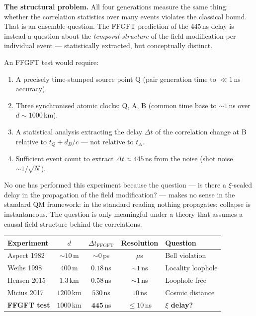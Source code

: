 \textbf{The structural problem.}
All four generations measure the same thing: whether the correlation statistics
over many events violates the classical bound. That is an ensemble question.
The FFGFT prediction of the 445\,ns delay is instead a question about the
\emph{temporal structure} of the field modification per individual event ---
statistically extracted, but conceptually distinct.

An FFGFT test would require:
\begin{enumerate}[leftmargin=1.6em,itemsep=0.2em]
  \item A precisely time-stamped source point Q (pair generation time to
    $\ll 1$\,ns accuracy).
  \item Three synchronised atomic clocks: Q, A, B (common time base to
    $\sim 1$\,ns over $d \sim 1000$\,km).
  \item A statistical analysis extracting the delay $\Delta t$ of the
    correlation change at B relative to $t_Q + d_B/c$ --- not relative
    to $t_A$.
  \item Sufficient event count to extract $\Delta t \approx 445$\,ns
    from the noise (shot noise $\sim 1/\sqrt{N}$).
\end{enumerate}

No one has performed this experiment because the question ---
is there a $\xi$-scaled delay in the propagation of the field modification?
--- makes no sense in the standard QM framework: in the standard reading
nothing propagates; collapse is instantaneous. The question is only
meaningful under a theory that assumes a causal field structure behind
the correlations.

\begin{center}
\small
\begin{tabular}{p{3.5cm}cccp{3.5cm}}
\toprule
Experiment & $d$ & $\Delta t_\text{FFGFT}$ & Resolution & Question \\
\midrule
Aspect 1982 & $\sim 10$\,m & $\sim 0$\,ps & $\mu$s & Bell violation \\
Weihs 1998 & $400$\,m & $0{.}18$\,ns & $\sim 1$\,ns & Locality loophole \\
Hensen 2015 & $1{.}3$\,km & $0{.}58$\,ns & $\sim 1$\,ns & Loophole-free \\
Micius 2017 & $1200$\,km & $530$\,ns & $10$\,ns & Cosmic distance \\
\textbf{FFGFT test} & $1000$\,km & $\mathbf{445}$\,ns & $\le 10$\,ns & \textbf{$\xi$ delay?} \\
\bottomrule
\end{tabular}
\end{center}

